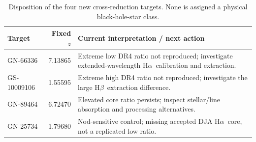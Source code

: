 \documentclass[11pt,a4paper]{article}
\newcommand{\ha}{H$\alpha$}
\newcommand{\hb}{H$\beta$}
\begin{document}
\begin{table}[!htbp]\centering\small
\caption{Disposition of the four new cross-reduction targets. None is assigned a physical black-hole-star class.}
\begin{tabularx}{\linewidth}{@{}l r X@{}}\toprule
Target & Fixed $z$ & Current interpretation / next action\\\midrule
GN-66336 & 7.13865 & Extreme low DR4 ratio not reproduced; investigate extended-wavelength \ha\ calibration and extraction.\\
GS-10009106 & 1.55595 & Extreme high DR4 ratio not reproduced; investigate the large \hb\ extraction difference.\\
GN-89464 & 6.72470 & Elevated core ratio persists; inspect stellar/line absorption and processing alternatives.\\
GN-25734 & 1.79680 & Nod-sensitive control; missing accepted DJA \ha\ core, not a replicated low ratio.\\\bottomrule
\end{tabularx}
\end{table}
\end{document}
